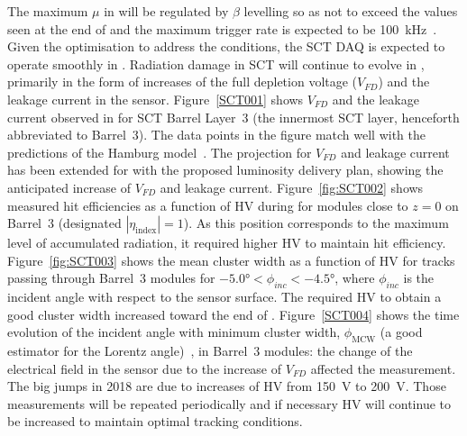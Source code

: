 \documentclass[cernpreprint, atlasdraft=false, UKenglish,british,orcidlogo, texmf, orcidlogo]{atlasdoc}
\begin{document}
The maximum $\mu$ in \RunThr will be regulated by $\beta$ levelling so as not to exceed the values seen at the end of \RunTwo and the maximum trigger rate is expected to be \SI{100}{\kHz}~\cite{SCTD-2019-01}. Given the optimisation to address the \RunTwo conditions, the \gls{SCT} \gls{DAQ} is expected to operate smoothly in \RunThr.
Radiation damage in \gls{SCT} will continue to evolve in \RunThr, primarily in the form of increases of the full depletion voltage ($V_{FD}$) and the leakage current in the sensor. Figure~\ref{SCT001} shows $V_{FD}$ and the leakage current observed in \RunTwo for \gls{SCT} Barrel Layer~3 (the innermost \gls{SCT} layer, henceforth abbreviated to Barrel~3). The data points in the figure match well with the predictions of the Hamburg model~\cite{hamburgmodel}. The projection for $V_{FD}$ and leakage current has been extended for \RunThr with the proposed luminosity delivery plan, showing the anticipated increase of $V_{FD}$ and leakage current. Figure~\ref{fig:SCT002} shows measured hit efficiencies as a function of \gls{HV} during \RunTwo for modules close to $z=0$ on Barrel~3 (designated $|\eta_\text{index}|=1$). As this position corresponds to the maximum level of accumulated radiation, it required higher \gls{HV} to maintain hit efficiency. Figure~\ref{fig:SCT003} shows the mean cluster width as a function of \gls{HV} for tracks passing through Barrel~3 modules for  $\ang{-5.0}<\phi_{inc}<\ang{-4.5}$, where $\phi_{inc}$ is the incident angle with respect to the sensor surface. The required \gls{HV} to obtain a good cluster width increased toward the end of \RunTwo. Figure~\ref{SCT004} shows the time evolution of the incident angle with minimum cluster width, $\phi_\text{MCW}$ (a good estimator for the Lorentz angle)~\cite{SCTD-2019-01}, in Barrel~3 modules: the change of the electrical field in the sensor due to the increase of $V_{FD}$ affected the measurement. The big jumps in 2018 are due to increases of \gls{HV} from \SI{150}{\V} to \SI{200}{\V}. Those measurements will be repeated periodically and if necessary \gls{HV} will continue to be increased to maintain optimal tracking conditions.
 
\end{document}
